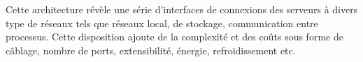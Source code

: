 

Cette architecture révèle une série d'interfaces de connexions des serveurs à divers type de réseaux tels que réseaux local, de stockage, communication entre processus. Cette disposition ajoute de la complexité et des coûts sous forme de câblage, nombre de ports, extensibilité, énergie, refroidissement etc. 

